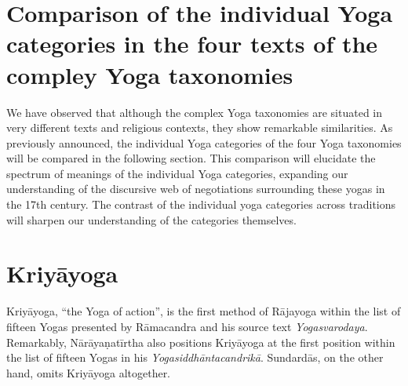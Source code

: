\section{Comparison of the individual Yoga categories in the four texts of the compley Yoga taxonomies}

We have observed that although the complex Yoga taxonomies are situated in very different texts and religious contexts, they show remarkable similarities. As previously announced, the individual Yoga categories of the four Yoga taxonomies will be compared in the following section. This comparison will elucidate the spectrum of meanings of the individual Yoga categories, expanding our understanding of the discursive web of negotiations surrounding these yogas in the 17th century. The contrast of the individual yoga categories across traditions will sharpen our understanding of the categories themselves.

\section{Kriyāyoga}

Kriyāyoga, ``the Yoga of action'', is the first method of Rājayoga within the list of fifteen Yogas presented by Rāmacandra and his source text \textit{Yogasvarodaya}. Remarkably, Nārāyaṇatīrtha also positions Kriyāyoga at the first position within the list of fifteen Yogas in his \textit{Yogasiddhāntacandrikā}. Sundardās, on the other hand, omits Kriyāyoga altogether. 

